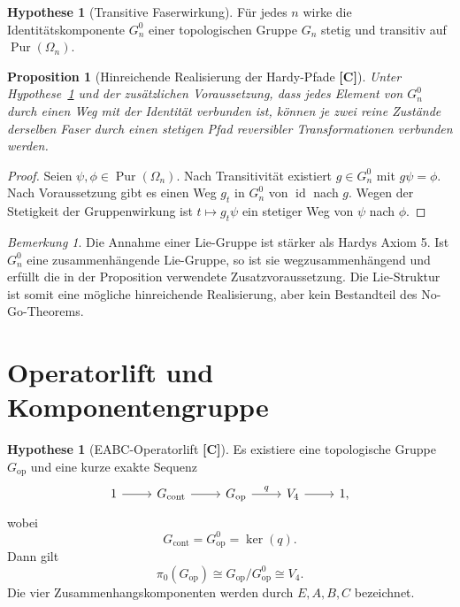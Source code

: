 \documentclass[11pt,a4paper,reqno]{amsart}
\newtheorem{proposition}[theorem]{Proposition}
\theoremstyle{definition}
\newtheorem{hypothesis}[theorem]{Hypothese}
\theoremstyle{remark}
\newtheorem{remark}[theorem]{Bemerkung}
\newcommand{\Pur}{\operatorname{Pur}}
\newcommand{\id}{\operatorname{id}}
\newcommand{\StatusC}{\textnormal{\textbf{[C]}}}
\begin{document}
\begin{hypothesis}[Transitive Faserwirkung]
\label{hyp:transitive}
Für jedes $n$ wirke die Identitätskomponente $G_n^0$ einer topologischen Gruppe $G_n$ stetig und transitiv auf $\Pur(\Omega_n)$.
\end{hypothesis}

\begin{proposition}[Hinreichende Realisierung der Hardy-Pfade \StatusC]
Unter Hypothese~\ref{hyp:transitive} und der zusätzlichen Voraussetzung, dass jedes Element von $G_n^0$ durch einen Weg mit der Identität verbunden ist, können je zwei reine Zustände derselben Faser durch einen stetigen Pfad reversibler Transformationen verbunden werden.
\end{proposition}

\begin{proof}
Seien $\psi,\phi\in\Pur(\Omega_n)$. Nach Transitivität existiert $g\in G_n^0$ mit $g\psi=\phi$. Nach Voraussetzung gibt es einen Weg $g_t$ in $G_n^0$ von $\id$ nach $g$. Wegen der Stetigkeit der Gruppenwirkung ist $t\mapsto g_t\psi$ ein stetiger Weg von $\psi$ nach $\phi$.
\end{proof}

\begin{remark}
Die Annahme einer Lie-Gruppe ist stärker als Hardys Axiom 5. Ist $G_n^0$ eine zusammenhängende Lie-Gruppe, so ist sie wegzusammenhängend und erfüllt die in der Proposition verwendete Zusatzvoraussetzung. Die Lie-Struktur ist somit eine mögliche hinreichende Realisierung, aber kein Bestandteil des No-Go-Theorems.
\end{remark}

\section{Operatorlift und Komponentengruppe}

\begin{hypothesis}[EABC-Operatorlift \StatusC]
\label{hyp:operator-lift}
Es existiere eine topologische Gruppe $G_{\mathrm{op}}$ und eine kurze exakte Sequenz
\begin{equation}
\begin{tikzcd}
1 \arrow[r]
& G_{\mathrm{cont}} \arrow[r]
& G_{\mathrm{op}} \arrow[r,"q"]
& V_4 \arrow[r]
& 1,
\end{tikzcd}
\end{equation}
wobei
\begin{equation}
G_{\mathrm{cont}}=G_{\mathrm{op}}^0=\ker(q).
\end{equation}
Dann gilt
\begin{equation}
\pi_0(G_{\mathrm{op}})
\cong
G_{\mathrm{op}}/G_{\mathrm{op}}^0
\cong V_4.
\end{equation}
Die vier Zusammenhangskomponenten werden durch $E,A,B,C$ bezeichnet.
\end{hypothesis}
\end{document}
